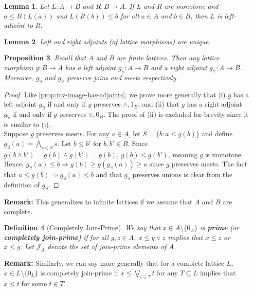 \documentclass{article}
\newtheorem{proposition}{Proposition}[section]
\newtheorem{lemma}[proposition]{Lemma}
\newtheorem{definition}[proposition]{Definition}
\newcommand{\meet}{\wedge}
\newcommand{\join}{\vee}
\newcommand{\bigmeet}{\bigwedge}
\newcommand{\bigjoin}{\bigvee}
\begin{document}
\begin{lemma}
Let $L : A \to B$ and $R : B \to A$. If $L$ and $R$ are monotone and $a \leq R(L(a))$ and $L(R(b)) \leq b$ for all $a \in A$ and $b \in B$, then $L$ is left-adjoint to $R$.
\end{lemma}

\begin{lemma}
Left and right adjoints (of lattice morphisms) are unique.
\end{lemma}

\begin{proposition}
Recall that $A$ and $B$ are finite lattices. Then any lattice morphism $g : B \to A$ has a left adjoint $g_\exists : A \to B$ and a right adjoint $g_\forall : A \to B$. Moreover, $g_\exists$ and $g_\forall$ preserve joins and meets respectively.
\end{proposition}

\begin{proof}
Like \cref{prop:inv-image-has-adjoints}, we prove more generally that (i) $g$ has a left adjoint $g_\exists$ if and only if $g$ preserves $\meet, 1_B$, and (ii) that $g$ has a right adjoint $g_\forall$ if and only if $g$ preserves $\join, 0_B$. The proof of (ii) is excluded for brevity since it is similar to (i). \\

Suppose $g$ preserves meets. For any $a \in A$, let $S = \{b : a \leq g(b)\}$ and define $g_\exists(a) = \bigmeet_{s \in S}s$. Let $b \leq b'$ for $b, b' \in B$. Since $g(b \meet b') = g(b) \meet g(b') = g(b)$, $g(b) \leq g(b')$, meaning $g$ is monotone. Hence, $g_\exists(a) \leq b \Rightarrow g(b) \geq g(g_\exists(a)) \geq a$ since $g$ preserves meets. The fact that $a \leq g(b) \Rightarrow g_\exists(a) \leq b$ and that $g_\exists$ preserves unions is clear from the definition of $g_\exists$.
\end{proof}

\textbf{Remark:} This generalizes to infinite lattices if we assume that $A$ and $B$ are complete.

\begin{definition}[Completely Join-Prime]
We say that $x \in A \setminus \{0_A\}$ is \textbf{prime} (or \textbf{completely join-prime}) if for all $y, z \in A$, $x \leq y \join z$ implies that $x \leq z$ or $x \leq y.$ Let $\mathcal{J}_A$ denote the set of join-prime elements of $A$. 
\end{definition}

\textbf{Remark:} Similarly, we can say more generally that for a complete lattice $L,$ $x \in L \setminus \{0_L\}$ is completely join-prime if $x \leq \bigjoin_{t \in T} t$ for any $T \subseteq L$ implies that $x \leq t$ for some $t \in T.$
\end{document}
